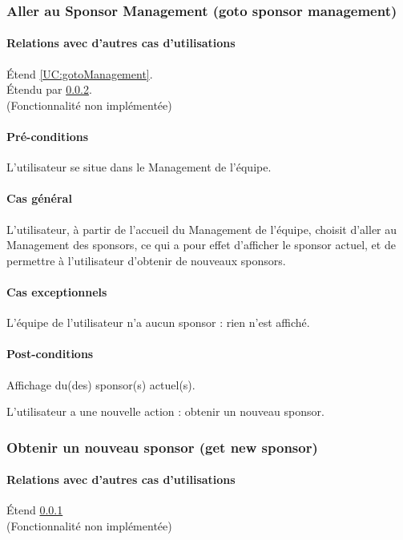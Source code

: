 \subsubsection{Aller au Sponsor Management (goto sponsor management)}
\label{UC:gotoSponsor}
\paragraph{Relations avec d'autres cas d'utilisations}
Étend \ref{UC:gotoManagement}.\\
Étendu par \ref{UC:getNewSponsor}.
\\(Fonctionnalité non implémentée)
\paragraph{Pré-conditions}
\begin{list}{}{\leftmargin=1.5em}
\item{L'utilisateur se situe dans le Management de l'équipe.}
\end{list}
\paragraph{Cas général}
L'utilisateur, à partir de l'accueil du Management de l'équipe, choisit d'aller au Management des sponsors, ce qui a pour effet d'afficher le sponsor actuel, et de permettre à l'utilisateur d'obtenir de nouveaux sponsors. 
\paragraph{Cas exceptionnels}
L'équipe de l'utilisateur n'a aucun sponsor : rien n'est affiché. 
\paragraph{Post-conditions}
\begin{list}{}{\leftmargin=1.5em}
\item{Affichage du(des) sponsor(s) actuel(s).}
\item{L'utilisateur a une nouvelle action : obtenir un nouveau sponsor.}
\end{list}

\subsubsection{Obtenir un nouveau sponsor (get new sponsor)}
\label{UC:getNewSponsor}
\paragraph{Relations avec d'autres cas d'utilisations}
Étend \ref{UC:gotoSponsor}
\\(Fonctionnalité non implémentée)
